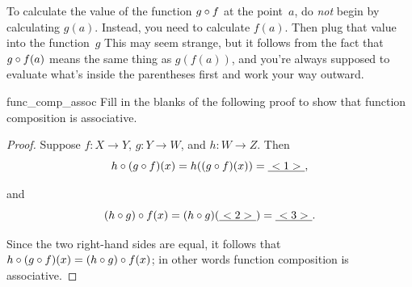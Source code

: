 \begin{warn} \label{ComposeWarn}
To calculate the value of the function $g \circ f$ at the point~$a$, do \emph{not} begin by calculating $g(a)$. Instead, you need to calculate $f(a)$. Then plug that value into the function~$g$ This may seem strange, but it follows from the fact that $g \circ f(a)$ means the same thing as $g ( f(a))$, and you're always supposed to evaluate what's inside the parentheses first and work your way outward.
\end{warn}

\begin{exercise}{func_comp_assoc}
Fill in the blanks of the following proof to show that function composition is associative.

\begin{proof}
Suppose $f: X \to Y$, $g: Y \to W$, and $h: W \to Z$. 
Then 
\[
h \circ (g \circ f)(x) = h((g \circ f)(x)) =\underline{~<1>~},\]

\noindent
and
\[ (h \circ g) \circ f(x) = (h \circ g)(\underline{~<2>~}) =  \underline{~<3>~}. \]

\noindent
Since the two right-hand sides are equal, it follows that $h \circ (g \circ f)(x) = (h \circ g) \circ f(x)$; in other words function composition is associative.
\end{proof}
\end{exercise}

